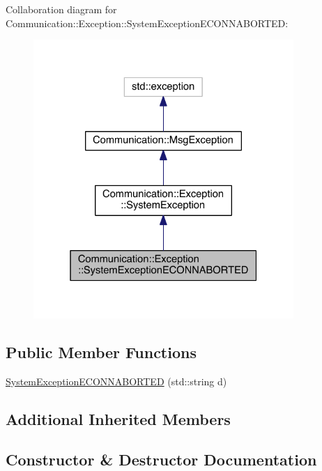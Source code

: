 Collaboration diagram for Communication\+:\+:Exception\+:\+:System\+Exception\+E\+C\+O\+N\+N\+A\+B\+O\+R\+T\+E\+D\+:\nopagebreak
\begin{figure}[H]
\begin{center}
\leavevmode
\includegraphics[width=280pt]{class_communication_1_1_exception_1_1_system_exception_e_c_o_n_n_a_b_o_r_t_e_d__coll__graph}
\end{center}
\end{figure}
\subsection*{Public Member Functions}
\begin{DoxyCompactItemize}
\item 
\hyperlink{class_communication_1_1_exception_1_1_system_exception_e_c_o_n_n_a_b_o_r_t_e_d_a5ecc4e47736c8a237475cb701e955e4e}{System\+Exception\+E\+C\+O\+N\+N\+A\+B\+O\+R\+T\+E\+D} (std\+::string d)
\end{DoxyCompactItemize}
\subsection*{Additional Inherited Members}


\subsection{Constructor \& Destructor Documentation}
\hypertarget{class_communication_1_1_exception_1_1_system_exception_e_c_o_n_n_a_b_o_r_t_e_d_a5ecc4e47736c8a237475cb701e955e4e}{}

